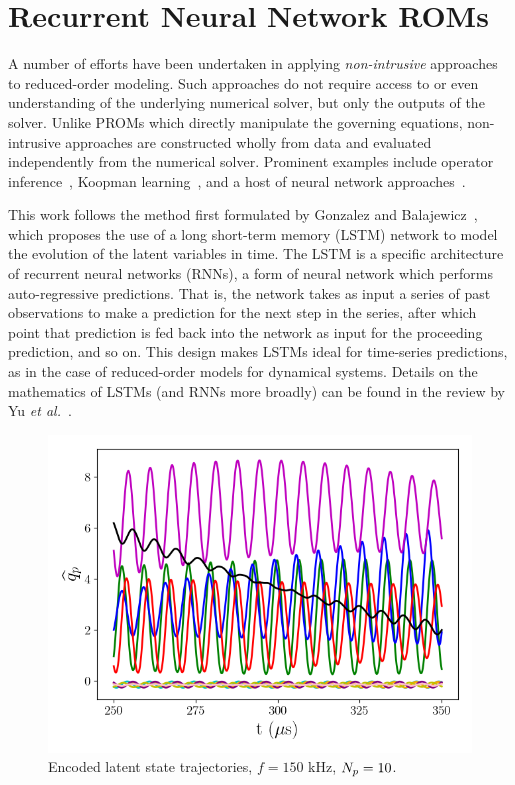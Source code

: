 \section{Recurrent Neural Network ROMs}

A number of efforts have been undertaken in applying \textit{non-intrusive} approaches to reduced-order modeling. Such approaches do not require access to or even understanding of the underlying numerical solver, but only the outputs of the solver. Unlike PROMs which directly manipulate the governing equations, non-intrusive approaches are constructed wholly from data and evaluated independently from the numerical solver. Prominent examples include operator inference~\cite{Peherstorfer2016,Qian2020}, Koopman learning~\cite{Pan2021}, and a host of neural network approaches~\cite{Gonzalez2018,Xu2020,Maulik2020}. 

This work follows the method first formulated by Gonzalez and Balajewicz~\cite{Gonzalez2018}, which proposes the use of a long short-term memory (LSTM) network to model the evolution of the latent variables in time. The LSTM is a specific architecture of recurrent neural networks (RNNs), a form of neural network which performs auto-regressive predictions. That is, the network takes as input a series of past observations to make a prediction for the next step in the series, after which point that prediction is fed back into the network as input for the proceeding prediction, and so on. This design makes LSTMs ideal for time-series predictions, as in the case of reduced-order models for dynamical systems. Details on the mathematics of LSTMs (and RNNs more broadly) can be found in the review by Yu \textit{et al.}~\cite{Yu2019}. 

\begin{figure}
    \centering
    \includegraphics[width=0.6\linewidth]{Chapters/TransientFlame/Images/nonlinear/latent_vars.png}
    \caption{\label{fig:flameLatentVars}Encoded latent state trajectories, $f = 150$ kHz, $N_p = 10$.}
\end{figure}

